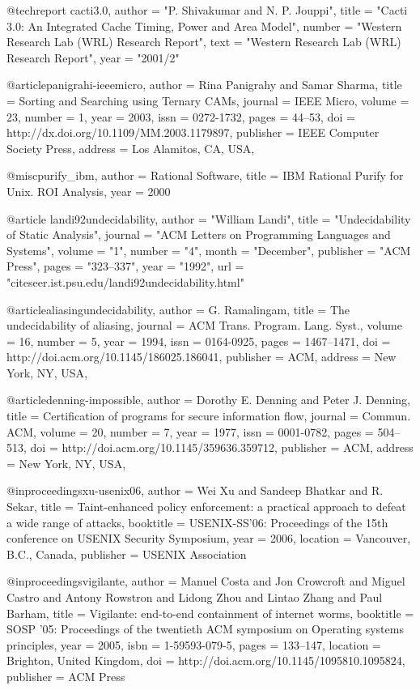 @techreport{ cacti3.0, 
  author = "P. Shivakumar and  N. P. Jouppi",
  title = "Cacti 3.0: {A}n {I}ntegrated {C}ache {T}iming, {P}ower and {A}rea {M}odel",
  number = "Western Research Lab (WRL) Research Report",
  text = "Western Research Lab (WRL) Research Report",
  year = "2001/2"
} 

@article{panigrahi-ieeemicro,
 author = {Rina Panigrahy and Samar Sharma},
 title = {Sorting and Searching using Ternary CAMs},
 journal = {IEEE Micro},
 volume = {23},
 number = {1},
 year = {2003},
 issn = {0272-1732},
 pages = {44--53},
 doi = {http://dx.doi.org/10.1109/MM.2003.1179897},
 publisher = {IEEE Computer Society Press},
 address = {Los Alamitos, CA, USA},
 }

@misc{purify_ibm,
  author = {{Rational Software}},
  title = {{IBM Rational Purify for Unix. ROI Analysis}},
  year = 2000
}

@article{ landi92undecidability,
    author = "William Landi",
    title = "Undecidability of Static Analysis",
    journal = "ACM Letters on Programming Languages and Systems",
    volume = "1",
    number = "4",
    month = "December",
    publisher = "ACM Press",
    pages = "323--337",
    year = "1992",
    url = "citeseer.ist.psu.edu/landi92undecidability.html" }

@article{aliasingundecidability,
 author = {G. Ramalingam},
 title = {The undecidability of aliasing},
 journal = {ACM Trans. Program. Lang. Syst.},
 volume = {16},
 number = {5},
 year = {1994},
 issn = {0164-0925},
 pages = {1467--1471},
 doi = {http://doi.acm.org/10.1145/186025.186041},
 publisher = {ACM},
 address = {New York, NY, USA},
 }

@article{denning-impossible,
 author = {Dorothy E. Denning and Peter J. Denning},
 title = {Certification of programs for secure information flow},
 journal = {Commun. ACM},
 volume = {20},
 number = {7},
 year = {1977},
 issn = {0001-0782},
 pages = {504--513},
 doi = {http://doi.acm.org/10.1145/359636.359712},
 publisher = {ACM},
 address = {New York, NY, USA},
 }

@inproceedings{xu-usenix06,
 author = {Wei Xu and Sandeep Bhatkar and R. Sekar},
 title = {Taint-enhanced policy enforcement: a practical approach to defeat a wide range of attacks},
 booktitle = {USENIX-SS'06: Proceedings of the 15th conference on USENIX Security Symposium},
 year = {2006},
 location = {Vancouver, B.C., Canada},
 publisher = {USENIX Association}
 }

@inproceedings{vigilante,
 author = {Manuel Costa and Jon Crowcroft and Miguel Castro and Antony Rowstron and Lidong Zhou and Lintao Zhang and Paul Barham},
 title = {Vigilante: end-to-end containment of internet worms},
 booktitle = {SOSP '05: Proceedings of the twentieth ACM symposium on Operating systems principles},
 year = {2005},
 isbn = {1-59593-079-5},
 pages = {133--147},
 location = {Brighton, United Kingdom},
 doi = {http://doi.acm.org/10.1145/1095810.1095824},
 publisher = {ACM Press}
 }

